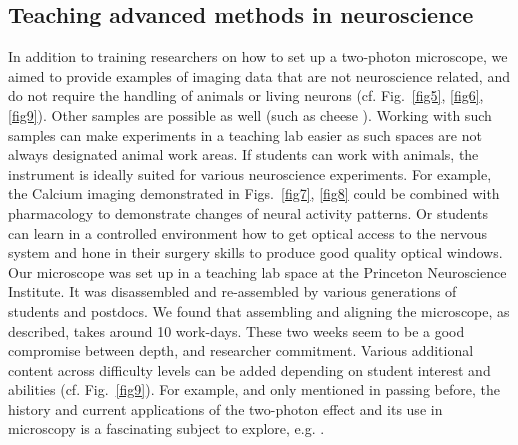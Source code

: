 \documentclass[10pt,letterpaper]{article}
\begin{document}
\subsection*{Teaching advanced methods in neuroscience}
In addition to training researchers on how to set up a two-photon microscope, we aimed to provide examples of imaging data that are not neuroscience related, and do not require the handling of animals or living neurons (cf. Fig.~\ref{fig5}, \ref{fig6}, \ref{fig9}). Other samples are possible as well (such as cheese \cite{Nguyen2001}). Working with such samples can make experiments in a teaching lab easier as such spaces are not always designated animal work areas. If students can work with animals, the instrument is ideally suited for various neuroscience experiments. For example, the Calcium imaging demonstrated in Figs.~\ref{fig7}, \ref{fig8} could be combined with pharmacology to demonstrate changes of neural activity patterns. Or students can learn in a controlled environment how to get optical access to the nervous system and hone in their surgery skills to produce good quality optical windows\cite{Holtmaat2009, Grienberger2022}.
Our microscope was set up in a teaching lab space at the Princeton Neuroscience Institute. It was disassembled and re-assembled by various generations of students and postdocs. We found that assembling and aligning the microscope, as described, takes around 10 work-days. These two weeks seem to be a good compromise between depth, and researcher commitment. Various additional content across difficulty levels can be added depending on student interest and abilities (cf. Fig.~\ref{fig9}). For example, and only mentioned in passing before, the history and current applications of the two-photon effect and its use in microscopy is a fascinating subject to explore, e.g. \cite{Sheppard2020, Yao2023}.\newline 
\end{document}
